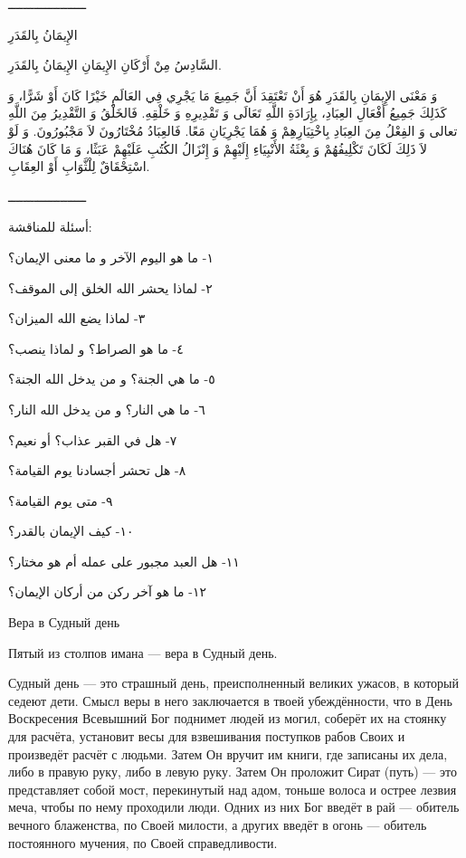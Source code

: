 \documentclass[a5paper]{article}
\begin{document}
ـــــــــــــــــــــ

الإِيمَانُ بِالقَدَرِ

السَّادِسُ مِنْ أَرْكَانِ الإِيمَانِ الإِيمَانُ بِالقَدَرِ.

وَ مَعْنَى الإِيمَانِ بِالقَدَرِ هُوَ أَنْ تَعْتَقِدَ أَنَّ جَمِيعَ مَا يَجْرِي فِي العَالَمِ خَيْرًا كَانَ أَوْ شَرًّا، وَ كَذَلِكَ جَمِيعُ أَفْعَالِ العِبَادِ، بِإِرَادَةِ اللَّهِ تَعَالَى وَ تَقْدِيرِهِ وَ خَلْقِهِ. فَالخَلْقُ وَ التَّقْدِيرُ مِنَ اللَّهِ تعالى وَ الفِعْلُ مِنَ العِبَادِ بِاخْتِيَارِهِمْ وَ هُمَا يَجْرِيَانِ مَعًا. فَالعِبَادُ مُخْتَارُونَ لاَ مَجْبُورُونَ. وَ لَوْ لاَ ذَلِكَ لَكَانَ تَكْلِيفُهُمْ وَ بِعْثَةُ الأَنْبِيَاءِ إِلَيْهِمْ وَ إِنْزَالُ الكُتُبِ عَلَيْهِمْ عَبَثًا، وَ مَا كَانَ هُنَاكَ اسْتِحْقَاقٌ لِلْثَّوَابِ أَوْ العِقَابِ.

ـــــــــــــــــــــ

أسئلة للمناقشة:

١- ما هو اليوم الآخر و ما معنى الإيمان؟

٢- لماذا يحشر الله الخلق إلى الموقف؟

٣- لماذا يضع الله الميزان؟

٤- ما هو الصراط؟ و لماذا ينصب؟

٥- ما هي الجنة؟ و من يدخل الله الجنة؟

٦- ما هي النار؟ و من يدخل الله النار؟

٧- هل في القبر عذاب؟ أو نعيم؟

٨- هل تحشر أجسادنا يوم القيامة؟

٩- متى يوم القيامة؟

١٠- كيف الإيمان بالقدر؟

١١- هل العبد مجبور على عمله أم هو مختار؟

١٢- ما هو آخر ركن من أركان الإيمان؟

Вера в Судный день

Пятый из столпов имана — вера в Судный день.

Судный день — это страшный день, преисполненный великих ужасов, в который седеют дети. Смысл веры в него заключается в твоей убеждённости, что в День Воскресения Всевышний Бог поднимет людей из могил, соберёт их на стоянку для расчёта, установит весы для взвешивания поступков рабов Своих и произведёт расчёт с людьми. Затем Он вручит им книги, где записаны их дела, либо в правую руку, либо в левую руку. Затем Он проложит Сират (путь) — это представляет собой мост, перекинутый над адом, тоньше волоса и острее лезвия меча, чтобы по нему проходили люди. Одних из них Бог введёт в рай — обитель вечного блаженства, по Своей милости, а других введёт в огонь — обитель постоянного мучения, по Своей справедливости.
\end{document}
